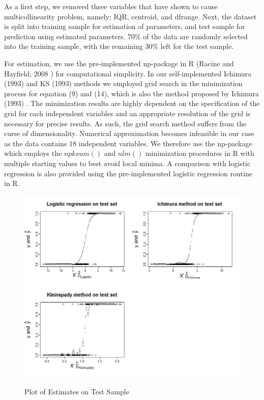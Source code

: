 \documentclass[a4paper]{article}
\begin{document}
As a first step, we removed three variables that have shown to cause multicollinearity problem,  namely; IQR, centroid, and dfrange. Next, the dataset is split into training sample for estimation of parameters, and test sample for prediction using estimated parameters. 70\% of the data are randomly selected into the training sample, with the remaining 30\% left for the test sample. 

For estimation, we use the pre-implemented np-package in R (Racine and Hayfield, 2008 \cite{[28]}) for computational simplicity. In our self-implemented Ichimura (1993) \cite{[6]} and KS (1993) \cite{[12]} methods we employed grid search in the minimization process for equation (9) and (14), which is also the method proposed by Ichimura (1993) \cite{[6]}. The minimization results are highly dependent on the specification of the grid for each independent variables and an appropriate resolution of the grid is necessary for precise results. As such, the grid search method suffers from the curse of dimensionality. Numerical approximation becomes infeasible in our case as the data contains 18 independent variables. We therefore use the np-package which employs the $npksum()$ and $nlm()$ minimization procedures in R with multiple starting values to best avoid local minima. A comparison with logistic regression is also provided using the pre-implemented logistic regression routine in R.

\begin{figure}[H]
  \includegraphics[width=\linewidth]{figure2.png}
  \label{fig: Plot of estimates on test sample}
  \caption{Plot of Estimates on Test Sample}
\end{figure}
\end{document}
